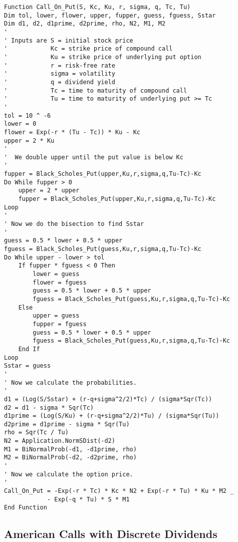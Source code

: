 \small\begin{verbatim}
Function Call_On_Put(S, Kc, Ku, r, sigma, q, Tc, Tu)
Dim tol, lower, flower, upper, fupper, guess, fguess, Sstar
Dim d1, d2, d1prime, d2prime, rho, N2, M1, M2
'
' Inputs are S = initial stock price
'            Kc = strike price of compound call
'            Ku = strike price of underlying put option
'            r = risk-free rate
'            sigma = volatility
'            q = dividend yield
'            Tc = time to maturity of compound call
'            Tu = time to maturity of underlying put >= Tc
'
tol = 10 ^ -6
lower = 0
flower = Exp(-r * (Tu - Tc)) * Ku - Kc
upper = 2 * Ku
'
'  We double upper until the put value is below Kc
'
fupper = Black_Scholes_Put(upper,Ku,r,sigma,q,Tu-Tc)-Kc
Do While fupper > 0
    upper = 2 * upper
    fupper = Black_Scholes_Put(upper,Ku,r,sigma,q,Tu-Tc)-Kc
Loop
'
' Now we do the bisection to find Sstar
'
guess = 0.5 * lower + 0.5 * upper
fguess = Black_Scholes_Put(guess,Ku,r,sigma,q,Tu-Tc)-Kc
Do While upper - lower > tol
    If fupper * fguess < 0 Then
        lower = guess
        flower = fguess
        guess = 0.5 * lower + 0.5 * upper
        fguess = Black_Scholes_Put(guess,Ku,r,sigma,q,Tu-Tc)-Kc
    Else
        upper = guess
        fupper = fguess
        guess = 0.5 * lower + 0.5 * upper
        fguess = Black_Scholes_Put(guess,Ku,r,sigma,q,Tu-Tc)-Kc
    End If
Loop
Sstar = guess
'
' Now we calculate the probabilities.
'
d1 = (Log(S/Sstar) + (r-q+sigma^2/2)*Tc) / (sigma*Sqr(Tc))
d2 = d1 - sigma * Sqr(Tc)
d1prime = (Log(S/Ku) + (r-q+sigma^2/2)*Tu) / (sigma*Sqr(Tu))
d2prime = d1prime - sigma * Sqr(Tu)
rho = Sqr(Tc / Tu)
N2 = Application.NormSDist(-d2)
M1 = BiNormalProb(-d1, -d1prime, rho)
M2 = BiNormalProb(-d2, -d2prime, rho)
'
' Now we calculate the option price.
'
Call_On_Put = -Exp(-r * Tc) * Kc * N2 + Exp(-r * Tu) * Ku * M2 _
            - Exp(-q * Tu) * S * M1
End Function
\end{verbatim}\normalsize

\subsection*{American Calls with Discrete Dividends}

